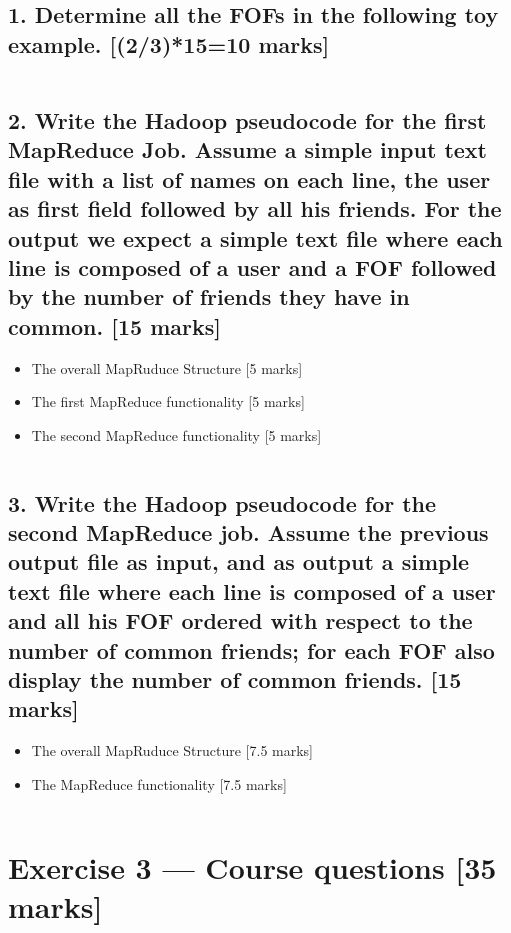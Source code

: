 \documentclass[11pt,a4paper]{article}
\begin{document}
\subsection*{1. Determine all the FOFs in the following toy example. [(2/3)*15=10 marks]}

\inputminted{shell}{../fof.txt}

\subsection*{2. Write the Hadoop pseudocode for the first MapReduce Job. Assume a simple input text file with a list of names on each line, the user as first field followed by all his friends. For the output we expect a simple text file where each line is composed of a user and a FOF followed by the number of friends they have in common. [15 marks]}

\begin{itemize}
\item The overall MapRuduce Structure [5 marks]
\item The first MapReduce functionality [5 marks]
\item The second MapReduce functionality [5 marks]
\end{itemize}

\inputminted{java}{../src/main/java/com/ve572/e1/FindFOF.java}

\subsection*{3. Write the Hadoop pseudocode for the second MapReduce job. Assume the previous output file as input, and as output a simple text file where each line is composed of a user and all his FOF ordered with respect to the number of common friends; for each FOF also display the number of common friends. [15 marks]}

\begin{itemize}
\item The overall MapRuduce Structure [7.5 marks]
\item The MapReduce functionality [7.5 marks]
\end{itemize}

\inputminted{java}{../src/main/java/com/ve572/e1/CountFOF.java}

\section*{Exercise 3 --- Course questions [35 marks]}
\end{document}
